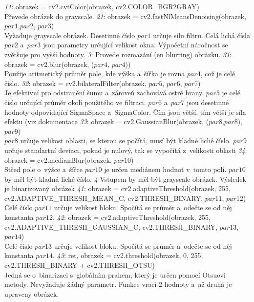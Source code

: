 \documentclass[12pt,oneside]{report}			%
\begin{document}
\begin{outline}
\1 \emph{11}: obrazek = cv2.cvtColor(obrazek, cv2.COLOR\_BGR2GRAY)\\ Převede obrázek do grayscale.
\1 \emph{21}: obrazek = cv2.fastNlMeansDenoising(obrazek, $par1$,$par2$, $par3$)\\
Vyžaduje grayscale obrázek. Desetinné číslo $par1$ určuje sílu filtru. Celá lichá čísla $par2$ a~$par3$ jsou parametry určující velikost okna. Výpočetní náročnost se zvětšuje pro vyšší hodnoty.
\1 \emph{3}: Provede rozmazání (\gls{en} blurring) obrázku. \parencite{CV_blur}
	\2 \emph{31}: obrazek = cv2.blur(obrazek, ($par4$, $par4$))\\ Použije aritmetický průměr pole, kde výška a~šířka je rovna $par4$, což je celé číslo.
	\2 \emph{32}: obrazek = cv2.bilateralFilter(obrazek, $par5$,  $par6$, $par7$)\\
	Je efektivní pro odstranění šumu a~zároveň zachovává ostré hrany. $par5$ je celé číslo určující průměr okolí použitého ve filtraci.	 $par6$ a~$par7$ jsou desetinné hodnoty odpovídající SigmaSpace a~SigmaColor. Čím jsou větší, tím větší je síla efektu (\gls{viz} dokumentace \parencite{CV_bilateral}
	\2 \emph{33}: obrazek = cv2.GaussianBlur(obrazek, ($par8$,$par8$), $par9$)\\  $par8$ určuje velikost oblasti, se kterou se počítá, musí být kladné liché číslo. $par9$ určuje standartní deviaci, pokud je nulový, tak se vypočítá z~velikosti oblasti
	\2 \emph{34}: obrazek = cv2.medianBlur(obrazek, $par10$) \\ Střed pole o~výšce a~šířce $par10$ je určen mediánem hodnot v~tomto poli. $par10$ by měl být kladná liché číslo.
\1 \emph{4} Vstupem by měl být grayscale obrázek.  Výsledek je binarizovaný obrázek \parencite{CV_threshold}
	\2 \emph{41}: obrazek = cv2.adaptiveThreshold(obrazek, 255,\\cv2.ADAPTIVE\_THRESH\_MEAN\_C, cv2.THRESH\_BINARY, $par11$, $par12$)\\ Celé číslo $par11$ určuje velikost bloku. Spočítá se průměr a~odečte se od něj konstanta $par12$.
	\2 \emph{42}:  obrazek = cv2.adaptiveThreshold(obrazek, 255,\\cv2.ADAPTIVE\_THRESH\_GAUSSIAN\_C, cv2.THRESH\_BINARY, $par13$, $par14$)\\ Celé číslo $par13$ určuje velikost bloku. Spočítá se průměr a~odečte se od něj konstanta $par14$.
	\2 \emph{43}: ret, obrazek = cv2.threshold(obrazek, 0, 255, cv2.THRESH\_BINARY + cv2.THRESH\_OTSU)\\
	Jedná se o~binarizaci s~globálním prahem, který je určen pomocí Otsuovi metody. Nevyžaduje žádný parametr. Funkce vrací 2 hodnoty a~až druhá je upravený obrázek.
\end{outline}
\end{document}
